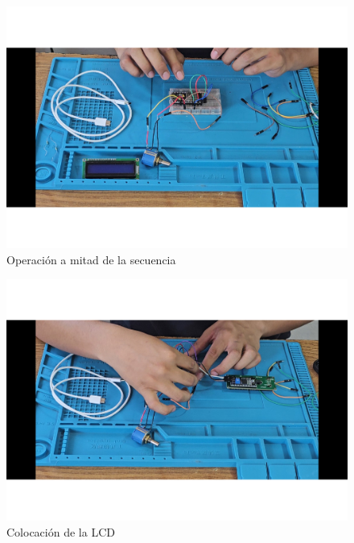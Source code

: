     \begin{figure}[H]
        \centering
        \includegraphics[trim = {7mm 1mm 1mm 1mm},clip,scale=0.25]{22/Img/e5.pdf}
        \caption{Operación a mitad de la secuencia}
        \label{fig:evi2}
    \end{figure}
    
    \begin{figure}[H]
        \centering
        \includegraphics[trim = {7mm 1mm 1mm 1mm},clip,scale=0.25]{22/Img/e8.pdf}
        \caption{Colocación de la LCD}
        \label{fig:evi3}
    \end{figure}
    
